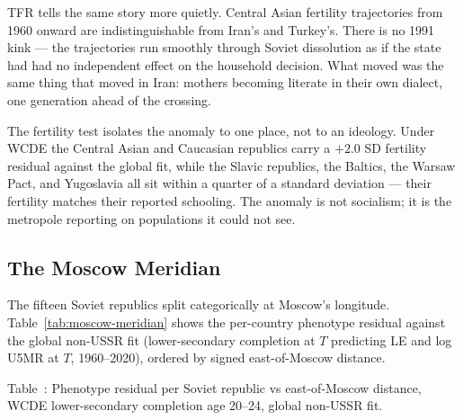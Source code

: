 \documentclass[12pt,letterpaper]{article}
\begin{document}
TFR tells the same story more quietly. Central Asian fertility
trajectories from 1960 onward are indistinguishable from Iran's and
Turkey's. There is no 1991 kink --- the trajectories run smoothly
through Soviet dissolution as if the state had had no independent
effect on the household decision. What moved was the same thing
that moved in Iran: mothers becoming literate in their own dialect,
one generation ahead of the crossing.

The fertility test isolates the anomaly to one place, not to an
ideology. Under WCDE the Central Asian and Caucasian republics carry
a $+2.0$ SD fertility residual against the global fit, while the
Slavic republics, the Baltics, the Warsaw Pact, and Yugoslavia all sit
within a quarter of a standard deviation --- their fertility matches
their reported schooling. The anomaly is not socialism; it is the
metropole reporting on populations it could not see.

\subsection{The Moscow Meridian}\label{moscow-meridian}

The fifteen Soviet republics split categorically at Moscow's
longitude. Table~\ref{tab:moscow-meridian} shows the per-country
phenotype residual against the global non-USSR fit (lower-secondary
completion at $T$ predicting LE and log U5MR at $T$, 1960--2020),
ordered by signed east-of-Moscow distance.

\label{tab:moscow-meridian}Table~\thetable: Phenotype residual per Soviet republic vs east-of-Moscow distance, WCDE lower-secondary completion age 20--24, global non-USSR fit.
\end{document}

